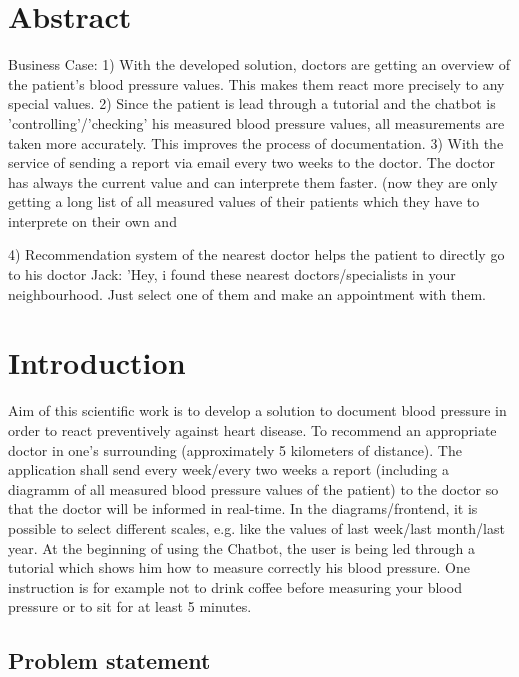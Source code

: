 





\chapter{Abstract}\label{abstract}

Business Case:
1) With the developed solution, doctors are getting an overview of the patient's blood pressure values. This makes them react more precisely to any special values. 
2) Since the patient is lead through a tutorial and the chatbot is 'controlling'/'checking' his measured blood pressure values, all measurements are taken more accurately. This improves the process of documentation.
3) With the service of sending a report via email every two weeks to the doctor. The doctor has always the current value and can interprete them faster. (now they are only getting a long list of all measured values of their patients which they have to interprete on their own and \begin{flushleft}
\end{flushleft}
4) Recommendation system of the nearest doctor helps the patient to directly go to his doctor 
Jack: 'Hey, i found these nearest doctors/specialists in your neighbourhood. Just select one of them and make an appointment with them. 

\chapter{Introduction}\label{introduction}

Aim of this scientific work is to develop a solution to document blood pressure in order to react preventively against heart disease.
To recommend an appropriate doctor in one's surrounding (approximately 5 kilometers of distance).
The application shall send every week/every two weeks a report (including a diagramm of all measured blood pressure values of the patient) to the doctor so that the doctor will be informed in real-time. In the diagrams/frontend, it is possible to select different scales, e.g. like the values of last week/last month/last year. 
At the beginning of using the Chatbot, the user is being led through a tutorial which shows him how to measure correctly his blood pressure. One instruction is for example not to drink coffee before measuring your blood pressure or to sit for at least 5 minutes.

\section{Problem statement}

